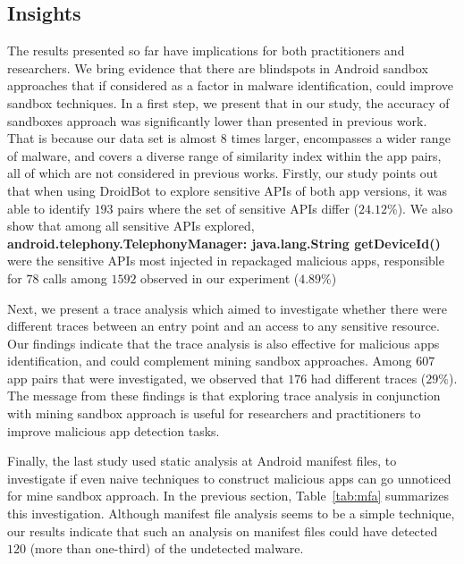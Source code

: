
\subsection{Insights}\label{sec:implications} 

The results presented so far have implications for both practitioners and researchers. We bring evidence that there are blindspots in Android sandbox approaches that if considered as a factor in malware identification, could improve sandbox techniques. In a first step, we present that in our study, the accuracy of sandboxes approach was significantly lower than presented in previous work. That is because our data set is almost $8$ times larger, encompasses a wider range of malware, and covers a diverse range of similarity index within the app pairs, all of which are not considered in previous works. Firstly, our study points out that when using DroidBot to explore sensitive APIs of both app versions, it was able to identify $193$ pairs where the set of sensitive APIs differ ($24.12$\%). We also show that among all sensitive APIs explored, \textbf{android.telephony.TelephonyManager: java.lang.String getDeviceId()} were the sensitive APIs most injected in repackaged malicious apps, responsible for $78$ calls among $1592$ observed in our experiment ($4.89\%$)

Next, we present a trace analysis which aimed to investigate whether there were different traces between an entry point and an access to any sensitive resource. Our findings indicate that the trace analysis is also effective for malicious apps identification, and could complement mining sandbox approaches. Among $607$ app pairs that were investigated, we observed that $176$ had different traces ($29\%$). The message from these findings is that exploring trace analysis in conjunction with mining sandbox approach is useful for researchers and practitioners to improve malicious app detection tasks. 

Finally, the last study used static analysis at Android manifest files, to investigate if even naive techniques to construct malicious apps can go unnoticed for mine sandbox approach. In the previous section, Table~\ref{tab:mfa} summarizes this investigation. Although manifest file analysis seems to be a simple technique, our results indicate that such an analysis on manifest files could have detected $120$ (more than one-third) of the undetected malware.

